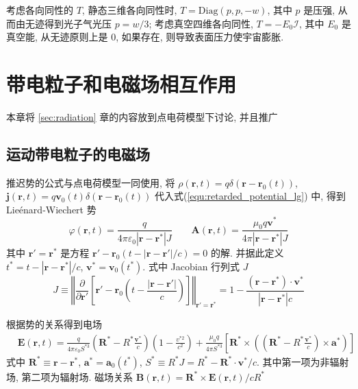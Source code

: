\documentclass[12pt,a4paper]{article}%
\numberwithin{equation}{section}%
\renewcommand*{\vec}[1]{\bm{#1}}%
\begin{document}
考虑各向同性的 $T$, 静态三维各向同性时, $T = \mathrm{Diag}(p,p,-w)$, 其中 $p$ 是压强, 从而由无迹得到光子气光压 $p = w/3$; 考虑真空四维各向同性, $T = -E_0 \mathcal I$, 其中 $E_0$ 是真空能, 从无迹原则上是 $0$, 如果存在, 则导致表面压力使宇宙膨胀.

\section{带电粒子和电磁场相互作用} %
\label{sec:elec_partic_and_field}
本章将 \ref{sec:radiation} 章的内容放到点电荷模型下讨论, 并且推广
\subsection{运动带电粒子的电磁场} %
\label{sub:EMF_of_a_moving_particle}
推迟势的公式与点电荷模型一同使用, 将 $\rho(\vec r, t) = q\delta(\vec r - \vec r_0(t))$, $\vec j(\vec r, t) = q\vec v_0(t)\delta(\vec r - \vec r_0(t))$ 代入式(\ref{equ:retarded_potential_lg}) 中, 得到 Lie\'enard-Wiechert 势
\begin{equation}\label{equ:lw_potential}
    \varphi(\vec r, t) = \frac{q}{4\pi\varepsilon_0|\vec r - \vec r^*|J} \qquad
    \vec A(\vec r,t) = \frac{\mu_0 q\vec v^*}{4\pi|\vec r - \vec r^*|J}
\end{equation}
其中 $\vec r' = \vec r^*$ 是方程 $\vec r' - \vec r_0(t-|\vec r- \vec r'|/c) = 0$ 的解. 并据此定义 $t^* = t-|\vec r - \vec r^*|/c$, $\vec v^* = \vec v_0(t^*)$. 式中 Jacobian 行列式 $J$
\begin{equation}
    J \equiv \left\Vert\frac{\partial}{\partial\vec r'}\left[\vec r' - \vec r_0\left(t-\frac{|\vec r- \vec r'|}{c}\right)\right] \right\Vert_{\vec r' = \vec r^*} 
    = 1 - \frac{(\vec r - \vec r^*)\cdot\vec v^*}{|\vec r - \vec r^*|c}
\end{equation}

根据势的关系得到电场
\begin{align}
    &\vec E(\vec r, t) = \frac{q}{4\pi\varepsilon_0 S^{*3}}\left(\vec R^* - R^*\frac{\vec v^*}c\right)\left(1-\frac{v^{*2}}{c^2}\right)
    + \frac{\mu_0q}{4\pi S^{*3}}\left[\vec R^*\times\left(\left(\vec R^* - R^*\frac{\vec v^*}c\right)\times\vec a^*\right)\right]
\end{align}
式中 $\vec R^* \equiv \vec r - \vec r^*$, $\vec a^* = \vec a_0(t^*)$, $S^*\equiv R^* J = R^*-\vec R^*\cdot\vec v^*/c$. 其中第一项为非辐射场, 第二项为辐射场. 磁场关系 $\vec B(\vec r, t) = \vec R^*\times \vec E(\vec r,t)/cR^*$
\end{document}
